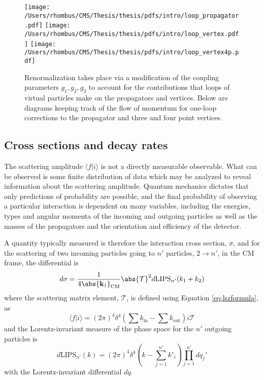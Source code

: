 \begin{figure}[!tb]
 \center
 \caption[One-loop corrections to vertices and propagator]{
  Renormalization takes place via a modification
   of the coupling parameters $g_1,g_2,g_3$ to account
   for the contributions that loops of virtual
   particles make on the propagators and vertices.
  Below are diagrams keeping track of the
   flow of momentum for one-loop corrections to the 
   propagator and three and four point vertices.
 } 
 \texttt{[image: /Users/rhombus/CMS/Thesis/thesis/pdfs/intro/loop\_propagator.pdf]}
 \texttt{[image: /Users/rhombus/CMS/Thesis/thesis/pdfs/intro/loop\_vertex.pdf]}
 \texttt{[image: /Users/rhombus/CMS/Thesis/thesis/pdfs/intro/loop\_vertex4p.pdf]}
    \label{fig:oneloopfeyn}
\end{figure}

\subsection{Cross sections and decay rates}

 The scattering amplitude $\langle f | i \rangle$
  is not a directly measurable observable.
 What can be observed is some finite distribution
  of data which may be analyzed to reveal
  information about the scattering amplitude.
 Quantum mechanics dictates that 
  only predictions of probability are possible,
  and the final probability of observing
  a particular interaction
  is dependent on many variables, including
  the energies, types and angular momenta of the incoming
  and outgoing particles as well as
  the masses of the propagators
  and the orientation and efficiency of the detector.

 A quantity typically measured is therefore the 
  interaction cross section, $\sigma$,
  and for the scattering of two incoming 
  particles going to $n'$ particles, $2\rightarrow n'$,
  in the CM frame, the differential is
\begin{equation}\label{eq:dsigma}
 d\sigma = \frac{1}{4\abs{\mathbf{k}_1}_{\mathrm{CM}}}\abs{\mathcal{T}}^2 
  d\mathrm{LIPS}_{n'}(k_1 + k_2)
\end{equation}
  where the scattering matrix element, $\mathcal{T}$,
  is defined using Equation \ref{eq:lszformula}, as 
\begin{equation}\label{eq:matrixelement}
\langle f | i \rangle = (2\pi)^4\delta^4\left(\sum k_{\mathrm{in}}-\sum k_{\mathrm{out}}\right)
  i \mathcal{T}
\end{equation}
  and the Lorentz-invariant measure of the 
  phase space for the $n'$ outgoing particles is
\begin{equation}\label{eq:dlips}
 d\mathrm{LIPS}_{n'}(k) = (2\pi)^4 \delta^4
  \left(k - \sum_{j=1}^{n'}k'_i \right )
  \prod_{j=1}^{n'}dq_j'
\end{equation}
 with the Lorentz-invariant differential $dq$.

